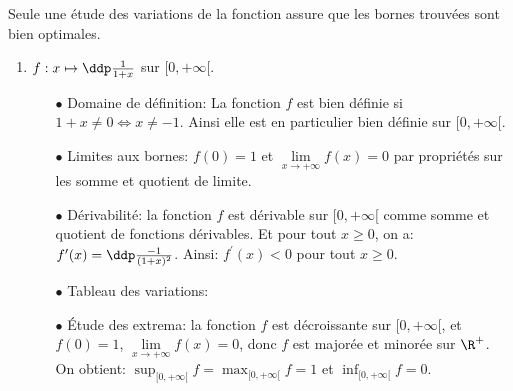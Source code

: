 
\begin{correction}  \;
Seule une \'etude des variations de la fonction assure que les bornes trouv\'ees sont bien optimales.
\begin{enumerate}
 \item $f: x\mapsto \ddp\frac{1}{1+x}  $ sur $\lbrack 0,+\infty\lbrack$.
\begin{itemize}
\item[$\bullet$] Domaine de d\'efinition: La fonction $f$ est bien d\'efinie si $1+x\not=0\Leftrightarrow x\not= -1$. Ainsi elle est en particulier bien d\'efinie sur $\lbrack 0,+\infty\lbrack$.
\item[$\bullet$] Limites aux bornes: $f(0)=1$ et $\lim\limits_{x\to +\infty} f(x)=0$ par propri\'et\'es sur les somme et quotient de limite.
\item[$\bullet$] D\'erivabilit\'e: la fonction $f$ est d\'erivable sur $\lbrack 0,+\infty\lbrack$ comme somme et quotient de fonctions d\'erivables. Et pour tout $x\geq 0$, on a: $f^{\prime}(x)=\ddp\frac{-1}{(1+x)^2}$. Ainsi: $f^{\prime}(x)<0$ pour tout $x\geq 0$. 
\item[$\bullet$] Tableau des variations:
\begin{center}
\end{center}
\item[$\bullet$] \'Etude des extrema: la fonction $f$ est d\'ecroissante sur $[0,+\infty[$, et $f(0)=1$, $\lim\limits_{x\to +\infty} f(x)=0$, donc $f$ est major\'ee et minor\'ee sur $\R^+$. On obtient: $\sup_{\lbrack 0,+\infty\lbrack } f=\max_{\lbrack 0,+\infty\lbrack} f=1$ et $\inf_{\lbrack 0,+\infty\lbrack } f=0$.
\end{itemize}

\end{enumerate}
\end{correction}
